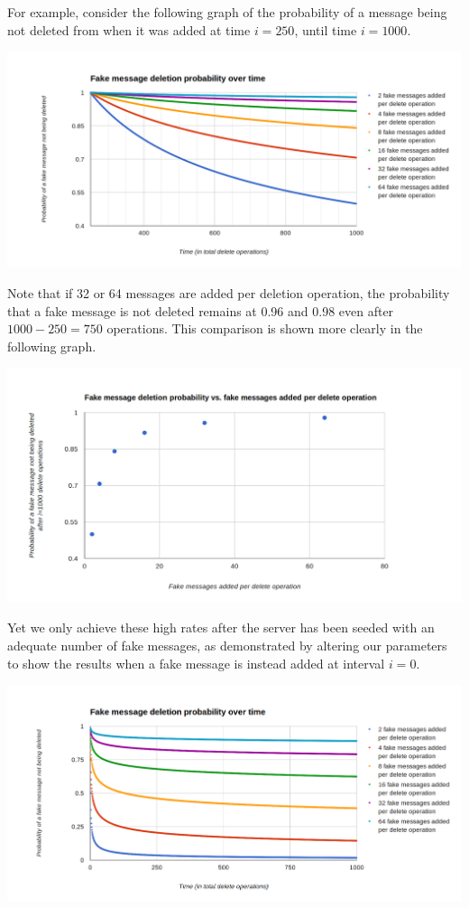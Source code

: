 \documentclass[pageno]{jpaper}
\begin{document}
For example, consider the following graph of the probability of a message being not deleted from when it was added at time $i=250$, until time $i=1000$.

\includegraphics[width=\textwidth]{many_lines_2}

Note that if 32 or 64 messages are added per deletion operation, the probability that a fake message is not deleted remains at 0.96 and 0.98 even after $1000-250=750$ operations. This comparison is shown more clearly in the following graph.

\includegraphics[width=\textwidth]{few-blue-dots-250}


Yet we only achieve these high rates after the server has been seeded with an adequate number of fake messages, as demonstrated by altering our parameters to show the results when a fake message is instead added at interval $i=0$.

\includegraphics[width=\textwidth]{fake-message-deletion-over-time}
\end{document}
